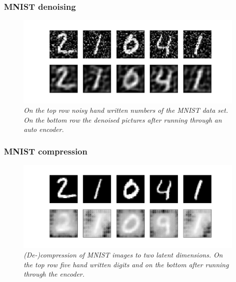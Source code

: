 \documentclass{beamer}
\begin{document}
\begin{frame}
\frametitle{MNIST denoising}
\begin{figure}
	\includegraphics[scale=0.5]{ae_denoised.pdf}
	\caption{\it On the top row noisy hand written numbers of the MNIST data set. On the bottom row the denoised pictures after running through an auto encoder.}
\end{figure}
\end{frame}

\begin{frame}
\frametitle{MNIST compression}
\begin{figure}
	\includegraphics[scale=0.5]{ae_compression.pdf}
	\caption{\it (De-)compression of MNIST images to two latent dimensions. On the top row five hand written digits and on the bottom after running through the encoder.}
\end{figure}
\end{frame}
\end{document}

